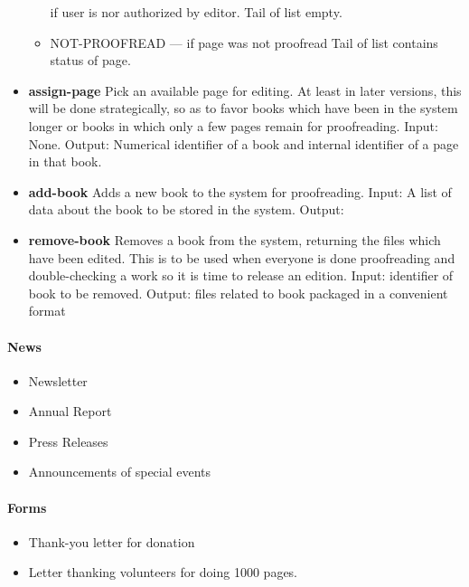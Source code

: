 \begin{itemize}
\begin{itemize}
    if user is nor authorized by editor. Tail of list empty. 
  \item
    NOT-PROOFREAD --- if page was not proofread Tail of list contains
    status of page.
  \end{itemize}
\item
  {\bf assign-page}  Pick an available page for editing. At least in later
  versions, this will be done strategically, so as to favor books which
  have been in the system longer or books in which only a few pages
  remain for proofreading.  Input: None.  Output: Numerical
  identifier of a book and internal identifier of a page in that book.
\item
  {\bf add-book}  Adds a new book to the system for proofreading.  Input:
  A list of data about the book to be stored in the system.  Output:
\item
  {\bf remove-book}  Removes a book from the system, returning the files
  which have been edited. This is to be used when everyone is done
  proofreading and double-checking a work so it is time to release an
  edition.  Input: identifier of book to be removed.  Output: files
  related to book packaged in a convenient format
\end{itemize}

\paragraph{News}

\begin{itemize}
\item
  Newsletter
\item
  Annual Report
\item
  Press Releases
\item
  Announcements of special events
\end{itemize}

\paragraph{Forms}

\begin{itemize}
\item
  Thank-you letter for donation
\item
  Letter thanking volunteers for doing 1000 pages.
\end{itemize}
